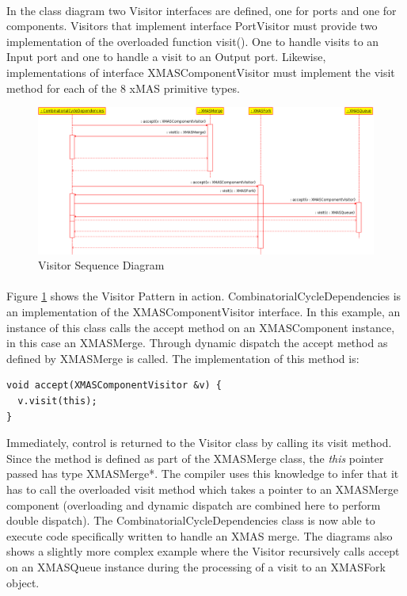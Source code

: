\documentclass[a4paper,11pt]{article}
\begin{document}
\paragraph{}
In the class diagram two Visitor interfaces are defined, one for ports and one for components.
Visitors that implement interface PortVisitor must provide two implementation of the overloaded
function visit(). One to handle visits to an Input port and one to handle a visit to an Output port.
Likewise, implementations of interface XMASComponentVisitor must implement the visit method
for each of the 8 xMAS primitive types.

\begin{figure}[h]
 \includegraphics[width=\textwidth]{images/visitor-sequence-diagram}
 \caption{Visitor Sequence Diagram}
 \label{fig:visitor-sequence-diagram}
\end{figure}

\paragraph{}
Figure \ref{fig:visitor-sequence-diagram} shows the Visitor Pattern in action.
CombinatorialCycleDependencies is an implementation of the XMASComponentVisitor interface.
In this example, an instance of this class calls the accept method on an XMASComponent
instance, in this case an XMASMerge. Through dynamic dispatch the accept method as
defined by XMASMerge is called. The implementation of this method is:\\
\begin{verbatim}
void accept(XMASComponentVisitor &v) {
  v.visit(this);
}
\end{verbatim}

Immediately, control is returned to the Visitor class by calling its visit method. Since the method
is defined as part of the XMASMerge class, the \emph{this} pointer passed has type XMASMerge*. The compiler
uses this knowledge to infer that it has to call the overloaded visit method which takes a pointer
to an XMASMerge component (overloading and dynamic dispatch are combined here to perform double
dispatch). The CombinatorialCycleDependencies class is now able to execute code specifically written
to handle an XMAS merge. The diagrams also shows a slightly more complex example where the Visitor
recursively calls accept on an XMASQueue instance during the processing of a visit to an XMASFork object.
\end{document}
